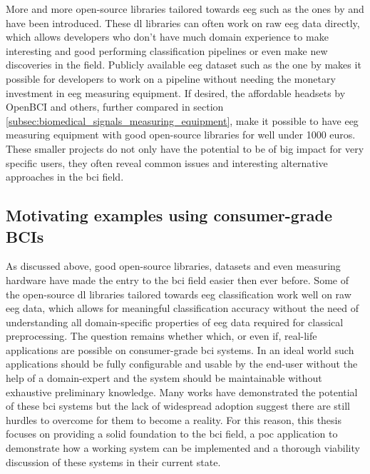 More and more open-source  libraries tailored towards \gls{eeg} such as the ones by \citet{eeg_model_hbm} and \citet{eeg_model_eegnet} have been introduced.
These \gls{dl} libraries can often work on raw \gls{eeg} data directly, which allows developers who don't have much domain experience to make interesting and good performing classification pipelines or even make new discoveries in the field.
Publicly available \gls{eeg} dataset such as the one by \citet{eeg_data} makes it possible for developers to work on a pipeline without needing the monetary investment in \gls{eeg} measuring equipment.
If desired, the affordable headsets by OpenBCI and others, further compared in section \ref{subsec:biomedical_signals_measuring_equipment}, make it possible to have \gls{eeg} measuring equipment with good open-source libraries for well under 1000 euros.
These smaller projects do not only have the potential to be of big impact for very specific users, they often reveal common issues and interesting alternative approaches in the \gls{bci} field.


\subsection{Motivating examples using consumer-grade BCIs}
\label{subsec:bci_small_projects_motivating_examples}

As discussed above, good open-source libraries, datasets and even measuring hardware have made the entry to the \gls{bci} field easier then ever before.
Some of the open-source \gls{dl} libraries tailored towards \gls{eeg} classification work well on raw \gls{eeg} data, which allows for meaningful classification accuracy without the need of understanding all domain-specific properties of \gls{eeg} data required for classical preprocessing.
The question remains whether which, or even if, real-life applications are possible on consumer-grade \gls{bci} systems.
In an ideal world such applications should be fully configurable and usable by the end-user without the help of a domain-expert and the system should be maintainable without exhaustive preliminary knowledge. 
Many works have demonstrated the potential of these \gls{bci} systems but the lack of widespread adoption suggest there are still hurdles to overcome for them to become a reality.
For this reason, this thesis focuses on providing a solid foundation to the \gls{bci} field, a \gls{poc} application to demonstrate how a working system can be implemented and a thorough viability discussion of these systems in their current state.

